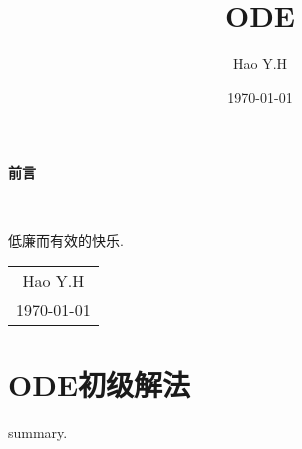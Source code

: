 \documentclass[12pt, a4paper, oneside]{ctexbook}
\title{{\Huge{\textbf{ODE}}}}
\author{Hao Y.H}
\date{\today}
\begin{document}
\maketitle

\setcounter{page}{1}

\begin{center}
    \Huge\textbf{前言}
\end{center}~\

低廉而有效的快乐.
~\\
\begin{flushright}
    \begin{tabular}{c}
        Hao Y.H\\
        \today
    \end{tabular}
\end{flushright}

\newpage
{}
\setcounter{page}{1}
\tableofcontents
\newpage
\setcounter{page}{1}

\chapter{ODE初级解法}

summary.
\end{document}
